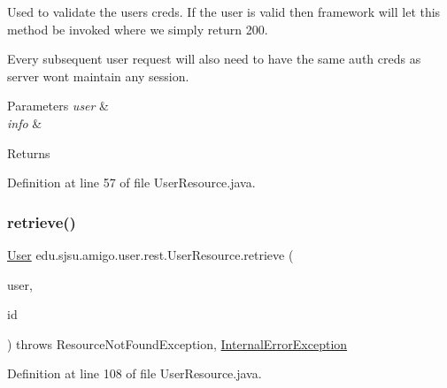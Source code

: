 Used to validate the user\textquotesingle{}s creds. If the user is valid then framework will let this method be invoked where we simply return 200. 

Every subsequent user request will also need to have the same auth creds as server wont maintain any session.


\begin{DoxyParams}{Parameters}
{\em user} & \\
\hline
{\em info} & \\
\hline
\end{DoxyParams}
\begin{DoxyReturn}{Returns}

\end{DoxyReturn}


Definition at line 57 of file User\+Resource.\+java.

\mbox{\label{classedu_1_1sjsu_1_1amigo_1_1user_1_1rest_1_1_user_resource_a3cddee66220e2775dc30c2e0c2879f83}} 
\subsubsection{\texorpdfstring{retrieve()}{retrieve()}}
{\footnotesize\ttfamily \hyperlink{classedu_1_1sjsu_1_1amigo_1_1user_1_1db_1_1model_1_1_user}{User} edu.\+sjsu.\+amigo.\+user.\+rest.\+User\+Resource.\+retrieve (\begin{DoxyParamCaption}\item[{@Auth \hyperlink{classedu_1_1sjsu_1_1amigo_1_1user_1_1auth_1_1_principal_user}{Principal\+User}}]{user,  }\item[{@Path\+Param(\char`\"{}id\char`\"{}) String}]{id }\end{DoxyParamCaption}) throws Resource\+Not\+Found\+Exception, \hyperlink{classedu_1_1sjsu_1_1amigo_1_1user_1_1rest_1_1_internal_error_exception}{Internal\+Error\+Exception}}



Definition at line 108 of file User\+Resource.\+java.

\mbox{\label{classedu_1_1sjsu_1_1amigo_1_1user_1_1rest_1_1_user_resource_a7d7c61de39c219479906b4f274882ddb}} 
